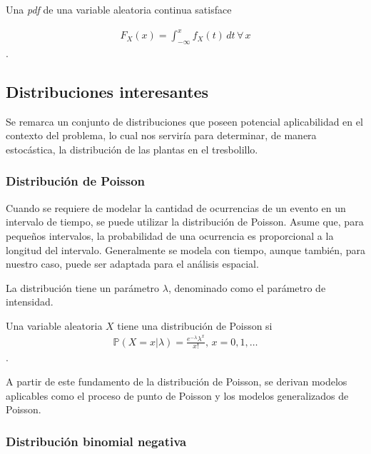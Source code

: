 \begin{definition}
    Una \textit{pdf} de una variable aleatoria continua satisface

    \begin{align}
        F_X(x)=\int_{-\infty}^{x}f_X(t)\,dt\,\forall\,x
    \end{align}\autocite{:berger2002}.
\end{definition}

\subsection{Distribuciones interesantes}

Se remarca un conjunto de distribuciones que poseen potencial aplicabilidad en el contexto del problema, lo cual nos serviría para determinar, de manera estocástica, la distribución de las plantas en el tresbolillo.

\subsubsection{Distribución de Poisson}

Cuando se requiere de modelar la cantidad de ocurrencias de un evento en un intervalo de tiempo, se puede utilizar la distribución de Poisson. Asume que, para pequeños intervalos, la probabilidad de una ocurrencia es proporcional a la longitud del intervalo. Generalmente se modela con tiempo, aunque también, para nuestro caso, puede ser adaptada para el análisis espacial.

La distribución tiene un parámetro $\lambda$, denominado como el parámetro de intensidad.

\begin{definition}
    Una variable aleatoria $X$ tiene una distribución de Poisson si
\begin{align}
    \mathbb{P}(X=x|\lambda)=\frac{e^{-\lambda}\lambda^x}{x!},\,x=0,1,\dots
\end{align}\autocite{:berger2002}.
\end{definition}

A partir de este fundamento de la distribución de Poisson, se derivan modelos aplicables como el proceso de punto de Poisson y los modelos generalizados de Poisson.

\subsubsection{Distribución binomial negativa}

